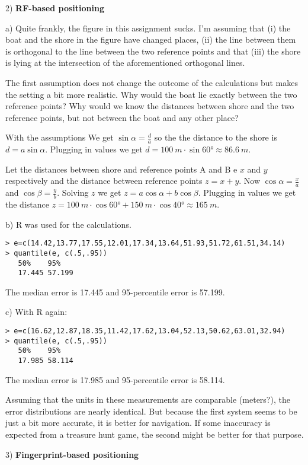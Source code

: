 \documentclass[a4paper,parskip=full]{scrartcl}
\begin{document}
2) \textbf{RF-based positioning}

a) Quite frankly, the figure in this assignment sucks. I'm assuming that (i) the
boat and the shore in the figure have changed places, (ii) the line between them
is orthogonal to the line between the two reference points and that (iii)
the shore is lying at the intersection of the aforementioned orthogonal lines.

The first assumption does not change the outcome of the calculations
but makes the setting a bit more realistic. Why would the boat lie exactly
between the two reference points? Why would we know the distances
between shore and the two reference points, but not between the boat and
any other place?

With the assumptions We get $\sin\alpha = \frac{d}{a}$ so the the distance to
the shore is $d = a\sin\alpha$. Plugging in values we get $d = \SI{100}{m}
\cdot \sin\ang{60} \approx \SI{86.6}{m}$.

Let the distances between shore
and reference points A and B e $x$ and $y$ respectively and the distance
between reference points $z = x + y$. Now $\cos\alpha = \frac{x}{a}$ and
$\cos\beta = \frac{y}{b}$. Solving $z$ we get $z = a\cos\alpha + b\cos\beta$.
Plugging in values we get the distance $z = \SI{100}{m} \cdot \cos\ang{60} +
\SI{150}{m} \cdot \cos\ang{40} \approx \SI{165}{m}$.

b) R was used for the calculations.
\begin{verbatim}
> e=c(14.42,13.77,17.55,12.01,17.34,13.64,51.93,51.72,61.51,34.14)
> quantile(e, c(.5,.95))
   50%    95%
   17.445 57.199
\end{verbatim}
The median error is 17.445 and 95-percentile error is 57.199.

c) With R again:
\begin{verbatim}
> e=c(16.62,12.87,18.35,11.42,17.62,13.04,52.13,50.62,63.01,32.94)
> quantile(e, c(.5,.95))
   50%    95%
   17.985 58.114
\end{verbatim}
The median error is 17.985 and 95-percentile error is 58.114.

Assuming that the units in these measurements are comparable (meters?),
the error distributions are nearly identical. But because the first system
seems to be just a bit more accurate, it is better for navigation. If some
inaccuracy is expected from a treasure hunt game, the second might be better
for that purpose.

3) \textbf{Fingerprint-based positioning}
\end{document}
